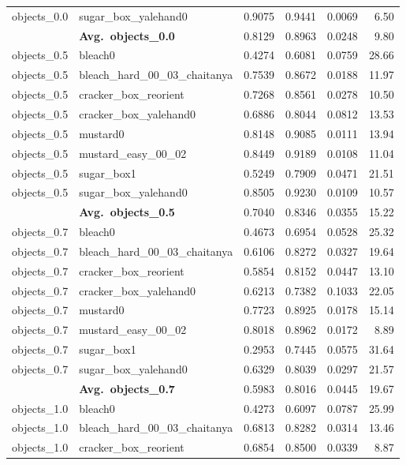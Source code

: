 \begin{longtable}{llrrrr}
  objects_0.0 & sugar\_box\_yalehand0 & 0.9075 & 0.9441 & 0.0069 & 6.50 \\
  \cmidrule{2-6}
  & \textbf{Avg.~objects_0.0} & 0.8129 & 0.8963 & 0.0248 & 9.80 \\
  \midrule
  objects_0.5 & bleach0 & 0.4274 & 0.6081 & 0.0759 & 28.66 \\
  objects_0.5 & bleach\_hard\_00\_03\_chaitanya & 0.7539 & 0.8672 & 0.0188 & 11.97 \\
  objects_0.5 & cracker\_box\_reorient & 0.7268 & 0.8561 & 0.0278 & 10.50 \\
  objects_0.5 & cracker\_box\_yalehand0 & 0.6886 & 0.8044 & 0.0812 & 13.53 \\
  objects_0.5 & mustard0 & 0.8148 & 0.9085 & 0.0111 & 13.94 \\
  objects_0.5 & mustard\_easy\_00\_02 & 0.8449 & 0.9189 & 0.0108 & 11.04 \\
  objects_0.5 & sugar\_box1 & 0.5249 & 0.7909 & 0.0471 & 21.51 \\
  objects_0.5 & sugar\_box\_yalehand0 & 0.8505 & 0.9230 & 0.0109 & 10.57 \\
  \cmidrule{2-6}
  & \textbf{Avg.~objects_0.5} & 0.7040 & 0.8346 & 0.0355 & 15.22 \\
  \midrule
  objects_0.7 & bleach0 & 0.4673 & 0.6954 & 0.0528 & 25.32 \\
  objects_0.7 & bleach\_hard\_00\_03\_chaitanya & 0.6106 & 0.8272 & 0.0327 & 19.64 \\
  objects_0.7 & cracker\_box\_reorient & 0.5854 & 0.8152 & 0.0447 & 13.10 \\
  objects_0.7 & cracker\_box\_yalehand0 & 0.6213 & 0.7382 & 0.1033 & 22.05 \\
  objects_0.7 & mustard0 & 0.7723 & 0.8925 & 0.0178 & 15.14 \\
  objects_0.7 & mustard\_easy\_00\_02 & 0.8018 & 0.8962 & 0.0172 & 8.89 \\
  objects_0.7 & sugar\_box1 & 0.2953 & 0.7445 & 0.0575 & 31.64 \\
  objects_0.7 & sugar\_box\_yalehand0 & 0.6329 & 0.8039 & 0.0297 & 21.57 \\
  \cmidrule{2-6}
  & \textbf{Avg.~objects_0.7} & 0.5983 & 0.8016 & 0.0445 & 19.67 \\
  \midrule
  objects_1.0 & bleach0 & 0.4273 & 0.6097 & 0.0787 & 25.99 \\
  objects_1.0 & bleach\_hard\_00\_03\_chaitanya & 0.6813 & 0.8282 & 0.0314 & 13.46 \\
  objects_1.0 & cracker\_box\_reorient & 0.6854 & 0.8500 & 0.0339 & 8.87 \\

\end{longtable}

